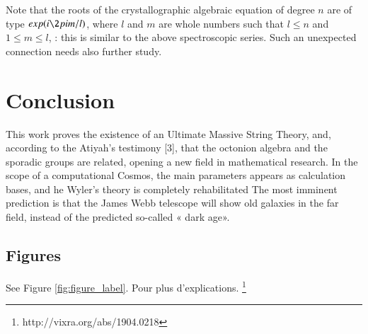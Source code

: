 \documentclass[a4paper,9pt]{article}
\begin{document}
    
    Note that the roots of the crystallographic algebraic equation of degree $n$ are of type $exp(i\2pi m/l)$, where $l$ and $m$ are whole numbers such that $l \le n$ and $1 \le m \le l$,  : this is similar to the above spectroscopic series. Such an unexpected connection needs also further study.


\section{Conclusion}

This work proves the existence of an Ultimate Massive String Theory, and, according to the Atiyah's testimony [3], that the octonion algebra and the sporadic groups are related, opening a new field in mathematical research. In the scope of a computational Cosmos, the main parameters appears as calculation bases, and he Wyler's theory is completely rehabilitated  The most imminent prediction is that the James Webb telescope will show old galaxies in the far field, instead of the predicted so-called « dark age».


\subsection{Figures}

See Figure \ref{fig:figure_label}. Pour plus d'explications. \footnote{http://vixra.org/abs/1904.0218}
 
\end{document}
